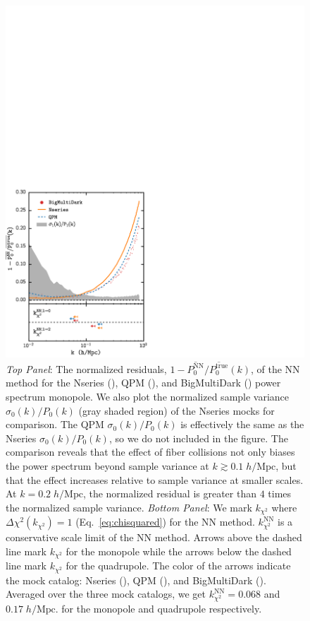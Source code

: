 \begin{figure}
\begin{center}
\includegraphics[width=1.\textwidth]{figs/fc/mock_catalog_NN_true_P0k_norm_resid_rebin6x.pdf} 
\caption{{\it Top Panel}: The normalized residuals, 
$1 - \overline{P_0^\mathrm{NN}}/\overline{P_0^\mathrm{true}}(k)$, 
of the NN method for the Nseries (\nseriescolor), 
QPM (\qpmcolor), and BigMultiDark (\bmdcolor) power spectrum monopole. 
We also plot the normalized sample variance $\sigma_0(k) / P_0(k)$ 
(gray shaded region) of the Nseries mocks for comparison.
The QPM $\sigma_0(k) / P_0(k)$ is effectively the same as the Nseries 
$\sigma_0(k)/P_0(k)$, so we do not included in the figure. 
The comparison reveals that the effect of fiber collisions not only 
biases the power spectrum beyond sample variance at $k \gtrsim 0.1 \;h/\mathrm{Mpc}$, 
but that the effect increases relative to sample variance at smaller scales. At 
$k = 0.2\;h/\mathrm{Mpc}$,  
the normalized residual is greater than $4$ times the normalized sample variance.
{\it Bottom Panel}: We mark $k_{\chi^2}$ where $\Delta \chi^2(k_{\chi^2}) = 1$ (Eq.~\ref{eq:chisquared}) for the NN method. $k^\mathrm{NN}_{\chi^2}$ is a conservative 
scale limit of the NN method. Arrows above the dashed 
line mark $k_{\chi^2}$ for the monopole while the arrows below the dashed line mark
$k_{\chi^2}$ for the quadrupole. The color of the arrows indicate the mock catalog: 
Nseries (\nseriescolor), QPM (\qpmcolor), and BigMultiDark (\bmdcolor). Averaged
over the three mock catalogs, we get $k^\mathrm{NN}_{\chi^2} = 0.068$ and $0.17 \;h/\mathrm{Mpc}$.
for the monopole and quadrupole respectively.}
\label{fig:NN_norm_resid}
\end{center}
\end{figure}
